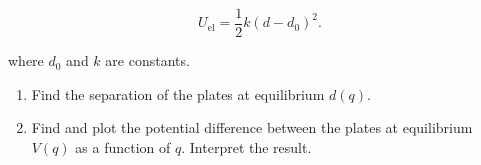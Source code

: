 \begin{equation}
	U_{\mathrm{el}}=\frac{1}{2} k\left(d-d_{0}\right)^{2}.
\end{equation}

where $d_{0}$ and $k$ are constants.

\begin{enumerate}
	\item Find the separation of the plates at equilibrium $d(q)$.
	\item Find and plot the potential difference between the plates at equilibrium $V(q)$ as a
	function of $q$. Interpret the result.
\end{enumerate}
